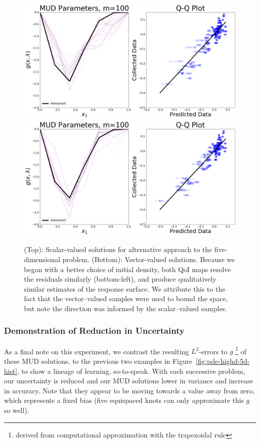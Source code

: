\begin{figure}[htbp]
\centering
  \includegraphics[width=0.95\linewidth]{figures/pde-highd/pde-highd_pair_D-alt-5-1_m100.png}
  \includegraphics[width=0.95\linewidth]{figures/pde-highd/pde-highd_pair_D-alt-5-5_m100.png}
\caption{
(Top): Scalar-valued solutions for alternative approach to the five-dimensional problem.
(Bottom): Vector-valued solutions.
Because we began with a better choice of initial density, both QoI maps resolve the residuals similarly (bottom-left), and produce qualitatively similar estimates of the response surface. We attribute this to the fact that the vector--valued samples were used to bound the space, but note the direction was informed by the scalar--valued samples.
}
\label{fig:pde-highd-5d-alt-mud}
\end{figure}
\FloatBarrier


\subsubsection{Demonstration of Reduction in Uncertainty}

As a final note on this experiment, we contrast the resulting $L^2$-errors to $g$ \footnote{derived from computational approximation with the trapezoidal rule} of these MUD solutions, to the previous two examples in Figure~\ref{fig:pde-highd-5d-hist}, to show a lineage of learning, so-to-speak.
With each successive problem, our uncertainty is reduced and our MUD solutions lower in variance and increase in accuracy.
Note that they appear to be moving towards a value away from zero, which represents a fixed bias (five equispaced knots can only approximate this $g$ so well).

